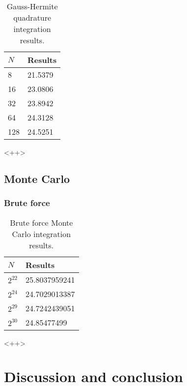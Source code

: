 \documentclass[a4paper,11pt]{article}
\begin{document}
\begin{table}
    \centering
    \caption{Gauss-Hermite quadrature integration results.}
    \begin{tabular}{l l}
        \hline
        $N$ &   Results \\
        \hline
        8   &   21.5379 \\
        16  &   23.0806 \\
        32  &   23.8942 \\
        64  &   24.3128 \\
        128 &   24.5251 \\
        \hline
    \end{tabular}
    \label{tab:<+label+>}
\end{table}<++>

\subsection{Monte Carlo}

\subsubsection{Brute force}

\begin{table}
    \centering
    \caption{Brute force Monte Carlo integration results.}
    \begin{tabular}{l l}
        \hline
        $N$ &   Results \\
        \hline
        $2^{22}$  & 25.8037959241 \\
        $2^{24}$  & 24.7029013387 \\
        $2^{29}$  & 24.7242439051 \\
        $2^{30}$  & 24.85477499   \\ 
        \hline
    \end{tabular}
    \label{tab:<+label+>}
\end{table}<++>

\section{Discussion and conclusion}



\end{document}
